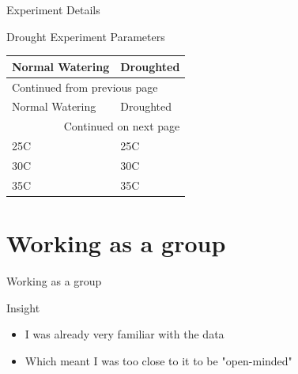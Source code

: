\documentclass[t, aspectratio=169]{beamer}
\begin{document}
\begin{frame}[label={sec:org4f7e882}]{Experiment Details}
\begin{block}{Drought Experiment Parameters}
\begin{longtable}{l|l}
\alert{Normal Watering} & \alert{Droughted}\\
\hline
\endfirsthead
\multicolumn{2}{l}{Continued from previous page} \\
\hline

\alert{Normal Watering} & \alert{Droughted} \\

\hline
\endhead
\hline\multicolumn{2}{r}{Continued on next page} \\
\endfoot
\endlastfoot
\hline
25C & 25C\\
30C & 30C\\
35C & 35C\\
\end{longtable}
\end{block}
\end{frame}


\section{Working as a group}
\label{sec:orgc7a3e2b}
\begin{frame}[label={sec:org9ae5bf5}]{Working as a group}
\begin{block}{Insight}
\begin{itemize}
\item I was already very familiar with the data
\item Which  meant I was too close to it to be "open-minded"
\end{itemize}
\end{block}
\end{frame}
\end{document}
